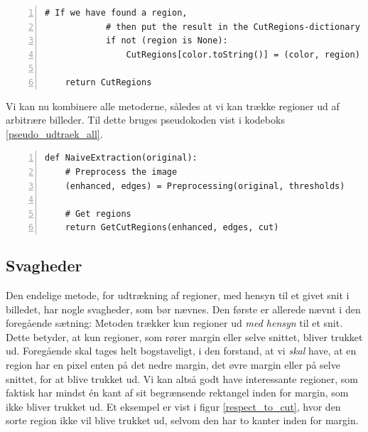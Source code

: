 {\begin{lstlisting}[caption={Pseudokode til udtrækning af regioner med
    margin.},captionpos=b,label={pseudo_udtraek_margin},numbers=left,
    frame=tb, breaklines=false, float=h]
            # If we have found a region,
            # then put the result in the CutRegions-dictionary
            if not (region is None):
                CutRegions[color.toString()] = (color, region)

    return CutRegions
\end{lstlisting}

Vi kan nu kombinere alle metoderne, således at vi kan trække regioner ud
af arbitrære billeder. Til dette bruges pseudokoden vist i kodeboks
\ref{pseudo_udtraek_all}.

\begin{lstlisting}[caption={Fuld udtrækning af regioner i et arbitært
    billede.},captionpos=b,label={pseudo_udtraek_all},numbers=left,
    frame=tb, breaklines=false, float=h]
def NaiveExtraction(original):
    # Preprocess the image
    (enhanced, edges) = Preprocessing(original, thresholds)

    # Get regions
    return GetCutRegions(enhanced, edges, cut)
\end{lstlisting}

\subsection{Svagheder\label{subsec_svagheder}}
Den endelige metode, for udtrækning af regioner, med hensyn til et givet
snit i billedet, har nogle svagheder, som bør nævnes. Den første er
allerede nævnt i den foregående sætning: Metoden trækker kun regioner ud
\emph{med hensyn} til et snit. Dette betyder, at kun regioner, som rører
margin eller selve snittet, bliver trukket ud. Foregående skal tages
helt bogstaveligt, i den forstand, at vi \emph{skal} have, at en region
har en pixel enten på det nedre margin, det øvre margin eller på selve
snittet, for at blive trukket ud. Vi kan altså godt have interessante
regioner, som faktisk har mindst én kant af sit begrænsende rektangel
inden for margin, som ikke bliver trukket ud. Et eksempel er vist i
figur \ref{respect_to_cut}, hvor den sorte region ikke vil blive trukket
ud, selvom den har to kanter inden for margin.

}

